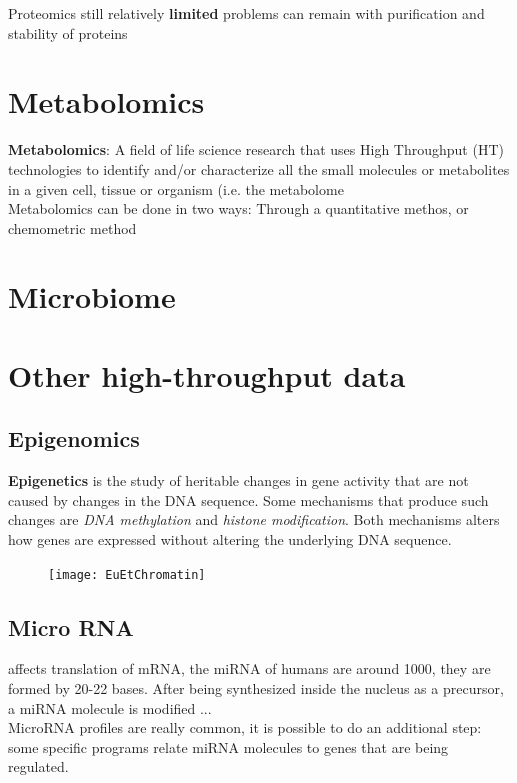 Proteomics still relatively \textbf{limited} problems can remain with purification and
stability of proteins

\section{Metabolomics}
\textbf{Metabolomics}: A field of life science research that uses High Throughput
(HT) technologies to identify and/or characterize all the small molecules or
metabolites in a given cell, tissue or organism (i.e. the metabolome
\\
Metabolomics can be done in two ways: Through a quantitative methos, or chemometric method 


\section{Microbiome}

\section{Other high-throughput data}
\subsection{Epigenomics}
\textbf{Epigenetics} is the study of heritable changes in gene
activity that are not caused by changes in the DNA sequence. Some mechanisms that produce such changes are
\textit{DNA methylation} and \textit{histone modification}. Both mechanisms alters how genes are expressed without
altering the underlying DNA sequence.

\begin{figure}[h]
\caption{}
\centering
\texttt{[image: EuEtChromatin]}
\end{figure}

\subsection{Micro RNA}
affects translation of mRNA, the miRNA of humans are around 1000, they are formed by 20-22 bases. After being synthesized inside the nucleus as a precursor, a miRNA molecule is modified ... %
\\
MicroRNA profiles are really common, it is possible to do an additional step: some specific programs relate miRNA molecules to genes that are being regulated.

